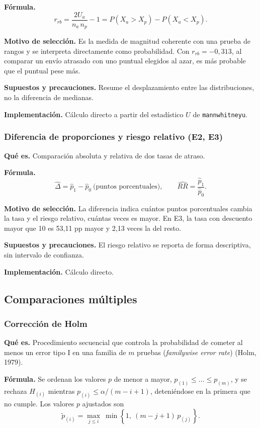 \documentclass[10pt,a4paper]{article}
\begin{document}
\textbf{Fórmula.}
\[
r_{rb}=\frac{2U_a}{n_a\,n_p}-1=P(X_a>X_p)-P(X_a<X_p).
\]

\textbf{Motivo de selección.} Es la medida de magnitud coherente con una prueba de rangos y se interpreta directamente como probabilidad. Con $r_{rb}=-0{,}313$, al comparar un envío atrasado con uno puntual elegidos al azar, es más probable que el puntual pese más.

\textbf{Supuestos y precauciones.} Resume el desplazamiento entre las distribuciones, no la diferencia de medianas.

\textbf{Implementación.} Cálculo directo a partir del estadístico $U$ de \texttt{mannwhitneyu}.

\subsubsection{Diferencia de proporciones y riesgo relativo (E2, E3)}
\textbf{Qué es.} Comparación absoluta y relativa de dos tasas de atraso.

\textbf{Fórmula.}
\[
\hat\Delta=\hat p_1-\hat p_0\ \text{(puntos porcentuales)},\qquad
\widehat{RR}=\frac{\hat p_1}{\hat p_0}.
\]

\textbf{Motivo de selección.} La diferencia indica cuántos puntos porcentuales cambia la tasa y el riesgo relativo, cuántas veces es mayor. En E3, la tasa con descuento mayor que 10 es 53,11 pp mayor y 2,13 veces la del resto.

\textbf{Supuestos y precauciones.} El riesgo relativo se reporta de forma descriptiva, sin intervalo de confianza.

\textbf{Implementación.} Cálculo directo.

\subsection{Comparaciones múltiples}

\subsubsection{Corrección de Holm}
\textbf{Qué es.} Procedimiento secuencial que controla la probabilidad de cometer al menos un error tipo I en una familia de $m$ pruebas (\emph{familywise error rate}) (Holm, 1979).

\textbf{Fórmula.} Se ordenan los valores $p$ de menor a mayor, $p_{(1)}\le\dots\le p_{(m)}$, y se rechaza $H_{(i)}$ mientras $p_{(i)}\le\alpha/(m-i+1)$, deteniéndose en la primera que no cumple. Los valores $p$ ajustados son
\[
\tilde p_{(i)}=\max_{j\le i}\ \min\left\{1,\ (m-j+1)\,p_{(j)}\right\}.
\]
\end{document}
